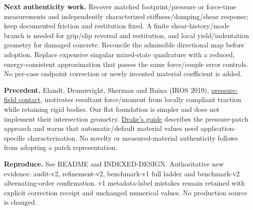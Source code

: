 \documentclass[10pt,a4paper]{article}
\begin{document}
\textbf{Next authenticity work.} Recover matched footprint/pressure or force-time
measurements and independently characterized stiffness/damping/shear response;
keep documented friction and restitution fixed. A finite shear-history/mode branch
is needed for grip/slip reversal and restitution, and local yield/indentation
geometry for damaged concrete. Reconcile the admissible directional map before
adoption. Replace expensive singular mixed-state quadrature with a reduced,
energy-consistent approximation that passes the same force/couple error controls.
No per-case endpoint correction or newly invented material coefficient is added.

\textbf{Precedent.} Elandt, Drumwright, Sherman and Ruina (IROS 2019),
\href{https://arxiv.org/abs/1904.11433}{pressure-field contact}, motivates resultant
force/moment from locally compliant traction while retaining rigid bodies. Our
flat foundation is simpler and does not implement their intersection geometry.
\href{https://drake.mit.edu/doxygen_cxx/group__hydroelastic__user__guide.html}{Drake's guide}
describes the pressure-patch approach and warns that automatic/default material
values need application-specific characterization. No novelty or measured-material
authenticity follows from adopting a patch representation.

\textbf{Reproduce.} See README and INDEXED-DESIGN. Authoritative new evidence:
audit-v2, refinement-v2, benchmark-v1 full ladder and benchmark-v2 alternating-order
confirmation. v1 metadata-label mistakes remain retained with explicit correction
receipt and unchanged numerical values. No production source is changed.
\end{document}
